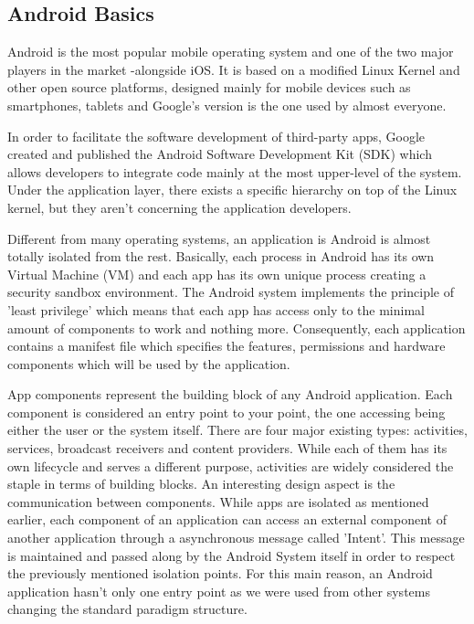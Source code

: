 \subsection*{Android Basics}

Android is the most popular mobile operating system and one of the two major players in the market -alongside iOS. It is based on a modified Linux Kernel and other open source platforms, designed mainly for mobile devices such as smartphones, tablets and Google's version is the one used by almost everyone.

In order to facilitate the software development of third-party apps, Google created and published the Android Software Development Kit (SDK) which allows developers to integrate code mainly at the most upper-level of the system. Under the application layer, there exists a specific hierarchy on top of the Linux kernel, but they aren't concerning the application developers.

Different from many operating systems, an application is Android is almost totally isolated from the rest. Basically, each process in Android has its own Virtual Machine (VM) and each app has its own unique process creating a security sandbox environment. The Android system implements the principle of 'least privilege' which means that each app has access only to the minimal amount of components to work and nothing more. Consequently, each application contains a manifest file which specifies the features, permissions and hardware components which will be used by the application. 

App components represent the building block of any Android application. Each component is considered an entry point to your point, the one accessing being either the user or the system itself. There are four major existing types: activities, services, broadcast receivers and content providers. While each of them has its own lifecycle
and serves a different purpose, activities are widely considered the staple in terms of building blocks. An interesting design aspect is the communication between components. While apps are isolated as mentioned earlier, each component of an application can access an external component of another application through a asynchronous message called 'Intent'. This message is maintained and passed along by the Android System itself in order to respect the previously mentioned isolation points. For this main reason, an Android application hasn't only one entry point as we were used from other systems changing the standard paradigm structure.


